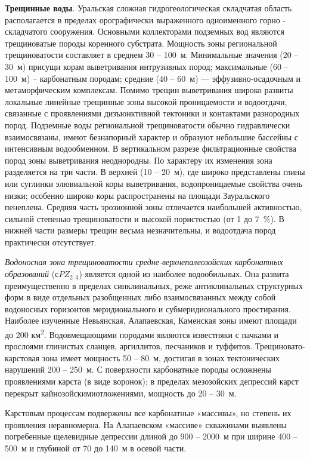 \textbf{Трещинные воды}. Уральская сложная гидрогеологическая складчатая область располагается в пределах орографически выраженного одноименного горно - складчатого сооружения. Основными коллекторами подземных вод являются трещиноватые породы коренного субстрата. Мощность зоны региональной трещиноватости составляет в среднем 30  --  100~м. Минимальные значения (20  --  30~м) присущи корам выветривания интрузивных пород; максимальные (60  --  100~м)  --  карбонатным породам; средние (40  --  60~м)  ---  эффузивно-осадочным и метаморфическим комплексам. Помимо трещин выветривания широко развиты локальные линейные трещинные зоны высокой проницаемости и водоотдачи, связанные с проявлениями дизъюнктивной тектоники и контактами разнородных пород. Подземные воды региональной трещиноватости обычно гидравлически взаимосвязаны, имеют безнапорный характер и образуют небольшие бассейны с интенсивным
водообменном. В вертикальном разрезе фильтрационные свойства пород зоны выветривания неоднородны. По характеру их изменения зона разделяется на три части. В верхней (10  --  20~м), где широко представлены глины или суглинки элювиальной коры выветривания, водопроницаемые свойства очень низки; особенно широко коры распространены на площади Зауральского пенеплена. Средняя часть эрозионной зоны отличается наибольшей активностью, сильной степенью трещиноватости и высокой пористостью (от 1 до 7~\%). В нижней части размеры трещин весьма незначительны, и водоотдача пород практически отсутствует.

\textit{Водоносная зона трещиноватости средне-верхнепалеозойских карбонатных образований} ($сPZ_{2–3}$) является одной из наиболее водообильных. Она развита преимущественно в пределах синклинальных, реже антиклинальных структурных форм в виде отдельных разобщенных либо взаимосвязанных между собой водоносных горизонтов меридионального и субмеридионального простирания. Наиболее изученные Невьянская, Алапаевская,
Каменская зоны имеют площади до 200 км\textsuperscript{2}. Водовмещающими породами являются известняки с пачками и прослоями глинистых сланцев, аргиллитов, песчаников и туффитов. Трещиновато-карстовая зона имеет мощность 50  --  80~м, достигая в зонах тектонических нарушений 200  --  250~м. С поверхности карбонатные породы осложнены проявлениями карста (в виде воронок); в пределах мезозойских депрессий карст перекрыт кайнозойскимиотложениями, мощность до 20  --  30~м.

Карстовым процессам подвержены все карбонатные «массивы», но степень их проявления неравномерна. На Алапаевском «массиве» скважинами выявлены погребенные щелевидные депрессии длиной до 900  --  2000~м
при ширине 400  --  500~м и глубиной от 70 до 140~м в осевой части.

